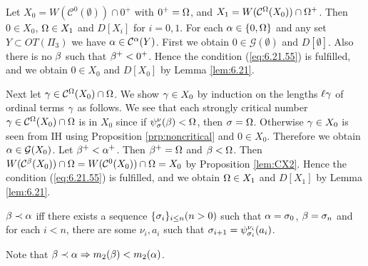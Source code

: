 \documentclass{article}
\begin{document}
\bprp\label{lem:6.29}
Let $X_{0}=W(\mathcal{C}^{0}(\emptyset))\cap 0^{+}$ with $0^{+}=\Omega$, and
$X_{1}=W(\mathcal{C}^{\Omega}(X_{0}))\cap\Omega^{+}$. Then
$0\in X_{0}$, $\Omega\in X_{1}$ and $D[X_{i}]$ for $i=0,1$.
\eprp
\bprf
For each $\alpha\in\{0,\Omega\}$ and any set $Y\subset OT(\Pi_{3})$ we have
$\alpha\in \mathcal{C}^{\alpha}(Y)$.
First 
we obtain 
$0\in\mathcal{G}(\emptyset)$ and $D[\emptyset]$.
Also there is no $\beta$ such that 
$\beta^{+}<0^{+}$.
Hence the condition (\ref{eq:6.21.55}) is fulfilled, and we obtain
$0\in X_{0}$ and $D[X_{0}]$ by 
Lemma \ref{lem:6.21}.


Next 
let $\gamma\in\mathcal{C}^{\Omega}(X_{0})\cap\Omega$.
We show $\gamma\in X_{0}$ by induction on the lengths $\ell\gamma$ of ordinal terms $\gamma$ as follows.
We see that
each strongly critical number $\gamma\in\mathcal{C}^{\Omega}(X_{0})\cap\Omega$ is in $X_{0}$
since 
if $\psi_{\sigma}^{\nu}(\beta)<\Omega$, then $\sigma=\Omega$.
Otherwise $\gamma\in X_{0}$ is seen from IH using Proposition \ref{prp:noncritical} and 
$0\in X_{0}$.
Therefore we obtain
$\alpha\in\mathcal{G}(X_{0})$.
Let $\beta^{+}<\alpha^{+}$. Then $\beta^{+}=\Omega$ and $\beta<\Omega$.
Then $W(\mathcal{C}^{\beta}(X_{0}))\cap\Omega=
W(\mathcal{C}^{0}(X_{0}))\cap\Omega=X_{0}$ by Proposition \ref{lem:CX2}.
Hence the condition (\ref{eq:6.21.55}) is fulfilled, and we obtain
$\Omega\in X_{1}$ and $D[X_{1}]$ by
Lemma \ref{lem:6.21}.
\eprf






\bdf
{\rm
$\beta\prec\alpha$ iff there exists a sequence $\{\sigma_{i}\}_{i\leq n}(n>0)$ such that
$\alpha=\sigma_{0}$, $\beta=\sigma_{n}$ and 
for each $i<n$, there are some $\nu_{i},a_{i}$ such that $\sigma_{i+1}=\psi_{\sigma_{i}}^{\nu_{i}}(a_{i})$.
}
\edf

Note that $\beta\prec\alpha \Rightarrow m_{2}(\beta)<m_{2}(\alpha)$.
\end{document}

